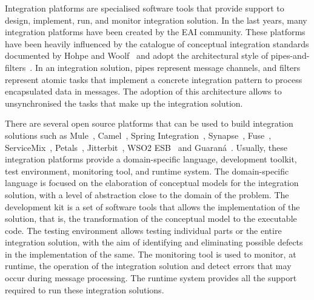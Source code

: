 Integration platforms are specialised software tools that provide support to design, implement, run, and monitor integration solution. 
In the last years, many integration platforms have been created by the EAI community. These platforms have been heavily influenced by the catalogue of conceptual integration standards documented by Hohpe and Woolf~\cite{hohpe2004} and adopt the architectural style of pipes-and-filters~\cite{alexander1977}. In an integration solution, pipes represent message channels, and filters represent atomic tasks that implement a concrete integration pattern to process encapsulated data in messages. The adoption of this architecture allows to unsynchronised the tasks that make up the integration solution.

There are several open source platforms that can be used to build integration solutions such as Mule~\cite{dossot2014}, Camel~\cite{isen2010}, Spring Integration~\cite{fisher2012}, Synapse~\cite{rademakers2008,jayasinghe2011}, Fuse~\cite{russell2012}, ServiceMix~\cite{konsek2013}, Petals~\cite{surhone2010}, Jitterbit~\cite{russell2012_1}, WSO2 ESB~\cite{indrasiri2016} and Guaraná~\cite{frantz2012}. Usually, these integration platforms provide a domain-specific language, development toolkit, test environment, monitoring tool, and runtime system. The domain-specific language is focused on the elaboration of conceptual models for the integration solution, with a level of abstraction close to the domain of the problem. The development kit is a set of software tools that allows the implementation of the solution, that is, the transformation of the conceptual model to the executable code. The testing environment allows testing individual parts or the entire integration solution, with the aim of identifying and eliminating possible defects in the implementation of the same. The monitoring tool is used to monitor, at runtime, the operation of the integration solution and detect errors that may occur during message processing. The runtime system provides all the support required to run these integration solutions.

